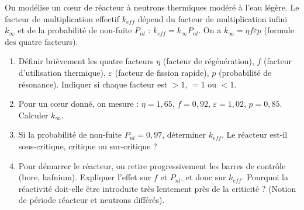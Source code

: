 \documentclass[11pt]{article}
\begin{document}
\begin{exercice}
On modélise un cœur de réacteur à neutrons thermiques modéré à l'eau légère. Le facteur de multiplication effectif $k_{eff}$ dépend du facteur de multiplication infini $k_{\infty}$ et de la probabilité de non-fuite $P_{nl}$ : $k_{eff} = k_{\infty} P_{nl}$. On a $k_{\infty} = \eta f \varepsilon p$ (formule des quatre facteurs).
\begin{enumerate}
    \item Définir brièvement les quatre facteurs $\eta$ (facteur de régénération), $f$ (facteur d'utilisation thermique), $\varepsilon$ (facteur de fission rapide), $p$ (probabilité de résonance). Indiquer si chaque facteur est $>1$, $=1$ ou $<1$.
    \item Pour un cœur donné, on mesure : $\eta = 1,65$, $f = 0,92$, $\varepsilon = 1,02$, $p = 0,85$. Calculer $k_{\infty}$.
    \item Si la probabilité de non-fuite $P_{nl} = 0,97$, déterminer $k_{eff}$. Le réacteur est-il sous-critique, critique ou sur-critique ?
    \item Pour démarrer le réacteur, on retire progressivement les barres de contrôle (bore, hafnium). Expliquer l'effet sur $f$ et $P_{nl}$, et donc sur $k_{eff}$. Pourquoi la réactivité doit-elle être introduite très lentement près de la criticité ? (Notion de période réacteur et neutrons différés).
\end{enumerate}
\end{exercice}
\end{document}
